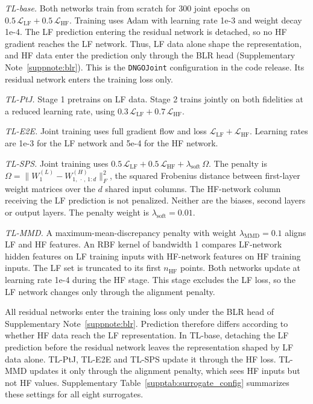 \emph{TL-base.} Both networks train from scratch for 300 joint epochs on $0.5\,\mathcal{L}_{\text{LF}} + 0.5\,\mathcal{L}_{\text{HF}}$. Training uses Adam with learning rate 1e-3 and weight decay 1e-4. The LF prediction entering the residual network is detached, so no HF gradient reaches the LF network. Thus, LF data alone shape the representation, and HF data enter the prediction only through the BLR head (Supplementary Note~\ref{suppnote:blr}). This is the \texttt{DNGOJoint} configuration in the code release. Its residual network enters the training loss only.

\emph{TL-PtJ.} Stage 1 pretrains on LF data. Stage 2 trains jointly on both fidelities at a reduced learning rate, using $0.3\,\mathcal{L}_{\text{LF}} + 0.7\,\mathcal{L}_{\text{HF}}$.

\emph{TL-E2E.} Joint training uses full gradient flow and loss $\mathcal{L}_{\text{LF}} + \mathcal{L}_{\text{HF}}$. Learning rates are 1e-3 for the LF network and 5e-4 for the HF network.

\emph{TL-SPS.} Joint training uses $0.5\,\mathcal{L}_{\text{LF}} + 0.5\,\mathcal{L}_{\text{HF}} + \lambda_{\text{soft}}\,\Omega$. The penalty is $\Omega = \bigl\|W^{(L)}_{1} - W^{(H)}_{1,\,\cdot\,,\,1:d}\bigr\|_F^2$, the squared Frobenius distance between first-layer weight matrices over the $d$ shared input columns. The HF-network column receiving the LF prediction is not penalized. Neither are the biases, second layers or output layers. The penalty weight is $\lambda_{\text{soft}}=0.01$.

\emph{TL-MMD.} A maximum-mean-discrepancy penalty with weight $\lambda_{\text{MMD}}=0.1$ aligns LF and HF features. An RBF kernel of bandwidth 1 compares LF-network hidden features on LF training inputs with HF-network features on HF training inputs. The LF set is truncated to its first $n_{\text{HF}}$ points. Both networks update at learning rate 1e-4 during the HF stage. This stage excludes the LF loss, so the LF network changes only through the alignment penalty.

All residual networks enter the training loss only under the BLR head of Supplementary Note~\ref{suppnote:blr}. Prediction therefore differs according to whether HF data reach the LF representation. In TL-base, detaching the LF prediction before the residual network leaves the representation shaped by LF data alone. TL-PtJ, TL-E2E and TL-SPS update it through the HF loss. TL-MMD updates it only through the alignment penalty, which sees HF inputs but not HF values. Supplementary Table~\ref{supptab:surrogate_config} summarizes these settings for all eight surrogates.

